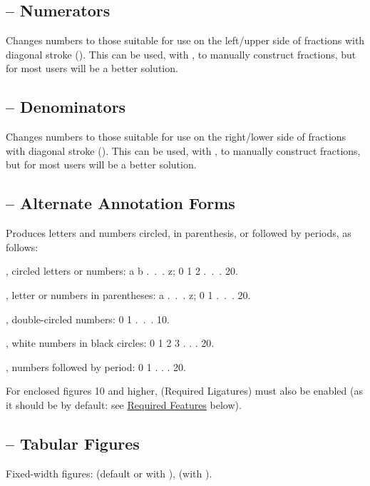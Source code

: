 \subsection{ -- Numerators}
Changes numbers to those suitable for use on the left/upper side of fractions
with diagonal stroke (). This can be used, with , to manually construct
fractions, but for most users  will be a better solution.

\subsection{ -- Denominators}
Changes numbers to those suitable for use on the right/lower side of fractions
with diagonal stroke (). This can be used, with , to manually construct
fractions, but for most users  will be a better solution.

\subsection{ -- Alternate Annotation Forms}
Produces letters and numbers circled, in parenthesis, or followed by periods, as follows:

, circled letters or numbers: {a b .~.~. z; 0 1 2 .~.~. 20}.

, letter or numbers in parentheses: {a .~.~. z; 0 1 .~.~. 20}.

, double-circled numbers: {0 1 .~.~. 10}.

, white numbers in black circles: {0 1 2 3 . . . 20}.

, numbers followed by period: {0 1 . . . 20}.

\noindent For enclosed figures 10 and higher,  (Required Ligatures) must also be enabled (as it should
be by default: see \hyperlink{req}{Required Features} below).

\subsection{ -- Tabular
Figures}
Fixed-width figures:  (default or with ),  (with
).

